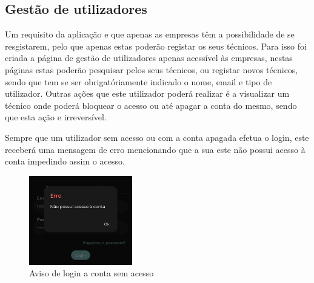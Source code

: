 \subsection{Gestão de utilizadores}
Um requisito da aplicação e que apenas as empresas têm a possibilidade de se resgistarem, pelo que apenas estas poderão registar os seus técnicos. Para isso foi criada a página de gestão de utilizadores apenas acessível às empresas, nestas páginas estas poderão pesquisar pelos seus técnicos, ou registar novos técnicos, sendo que tem se ser obrigatóriamente indicado o nome, email e tipo de utilizador. Outras ações que este utilizador poderá realizar é a visualizar um técnico onde poderá bloquear o acesso ou até apagar a conta do mesmo, sendo que esta ação e irreversível.


\begin{figure}[htb]%
  \centering
  \qquad
  \label{fig:69}%
\end{figure}

Sempre que um utilizador sem acesso ou com a conta apagada efetua o login, este receberá uma mensagem de erro mencionando que a sua este não possui acesso à conta impedindo assim o acesso.

\begin{figure}[htb]
  \centering
  \includegraphics[width=0.4\textwidth]{images/implementacao/frontend/gestao_users/1686054218243.jpg}
  \caption{Aviso de login a conta sem acesso}
  \label{fig:70}
\end{figure}